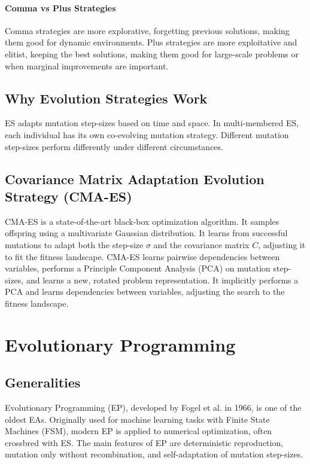 \paragraph*{Comma vs Plus Strategies}
Comma strategies are more explorative, forgetting previous solutions, making them good for dynamic environments. Plus strategies are more exploitative and elitist, keeping the best solutions, making them good for large-scale problems or when marginal improvements are important.

\subsection*{Why Evolution Strategies Work}
ES adapts mutation step-sizes based on time and space.  In multi-membered ES, each individual has its own co-evolving mutation strategy. Different mutation step-sizes perform differently under different circumstances.

\subsection*{Covariance Matrix Adaptation Evolution Strategy (CMA-ES)}
CMA-ES is a state-of-the-art black-box optimization algorithm. It samples offspring using a multivariate Gaussian distribution. It learns from successful mutations to adapt both the step-size $\sigma$ and the covariance matrix $C$, adjusting it to fit the fitness landscape. CMA-ES learns pairwise dependencies between variables, performs a Principle Component Analysis (PCA) on mutation step-sizes, and learns a new, rotated problem representation.  It implicitly performs a PCA and learns dependencies between variables, adjusting the search to the fitness landscape.

\section{Evolutionary Programming}
\subsection*{Generalities}
Evolutionary Programming (EP), developed by Fogel et al. in 1966, is one of the oldest EAs.  Originally used for machine learning tasks with Finite State Machines (FSM), modern EP is applied to numerical optimization, often crossbred with ES. The main features of EP are deterministic reproduction, mutation only without recombination, and self-adaptation of mutation step-sizes.

